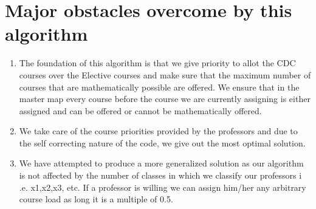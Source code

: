 \documentclass[12pt, letterpaper]{article}
\begin{document}
\section{Major obstacles overcome by this algorithm}
\begin{enumerate}
\item The foundation of this algorithm is that we give priority to allot the CDC courses over the Elective courses and make sure that the maximum number of courses that are mathematically possible are offered. We ensure that in the master map every course before the course we are currently assigning is either assigned and can be offered or cannot be mathematically offered.
\item We take care of the course priorities provided by the professors and due to the self correcting nature of the code, we give out the most optimal solution.
\item We have attempted to produce a more generalized solution as our algorithm is not affected by the number of classes in which we classify our professors i .e. x1,x2,x3, etc. If a professor is willing we can assign him/her any arbitrary course load as long it is a multiple of 0.5.
\end{enumerate}
\end{document}
